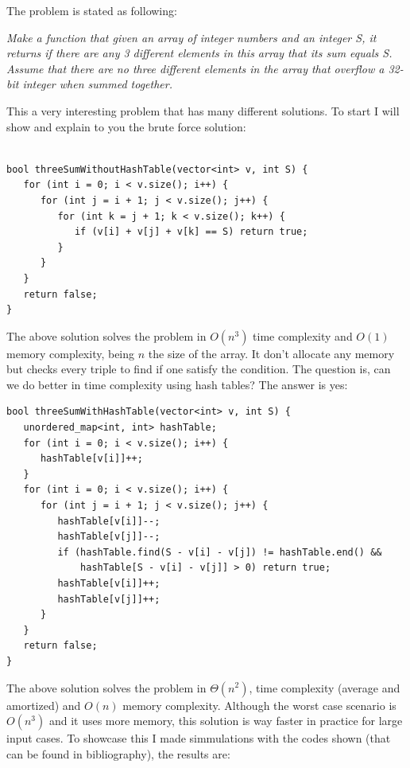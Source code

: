 The problem is stated as following:

\textit{Make a function that given an array of integer numbers and an integer S, it returns if there are any 3 different elements in this array that its sum equals S. Assume that there are no three different elements in the array that overflow a 32-bit integer when summed together.}

This a very interesting problem that has many different solutions. To start I will show and explain to you the brute force solution: \\
\\
\bigskip

\begin{lstlisting}
bool threeSumWithoutHashTable(vector<int> v, int S) {
   for (int i = 0; i < v.size(); i++) {
      for (int j = i + 1; j < v.size(); j++) {
         for (int k = j + 1; k < v.size(); k++) {
            if (v[i] + v[j] + v[k] == S) return true;
         }
      }
   }
   return false;
}
\end{lstlisting}

\medskip

The above solution solves the problem in \( O(n^3) \) time complexity and \( O(1) \) memory complexity, being \( n \) the size of the array. It don't allocate any memory but checks every triple to find if one satisfy the condition. The question is, can we do better in time complexity using hash tables? The answer is yes:

\medskip

\begin{lstlisting}
bool threeSumWithHashTable(vector<int> v, int S) {
   unordered_map<int, int> hashTable; 
   for (int i = 0; i < v.size(); i++) {
      hashTable[v[i]]++;
   }
   for (int i = 0; i < v.size(); i++) {
      for (int j = i + 1; j < v.size(); j++) {
         hashTable[v[i]]--;
         hashTable[v[j]]--;         
         if (hashTable.find(S - v[i] - v[j]) != hashTable.end() &&
             hashTable[S - v[i] - v[j]] > 0) return true;
         hashTable[v[i]]++;
         hashTable[v[j]]++;
      }
   }
   return false;
}
\end{lstlisting}

\medskip

The above solution solves the problem in \( \Theta(n^2) \), time complexity (average and amortized) and \( O(n) \) memory complexity. Although the worst case scenario is \( O(n^3) \) and it uses more memory, this solution is way faster in practice for large input cases. To showcase this I made simmulations with the codes shown (that can be found in bibliography), the results are: \\

